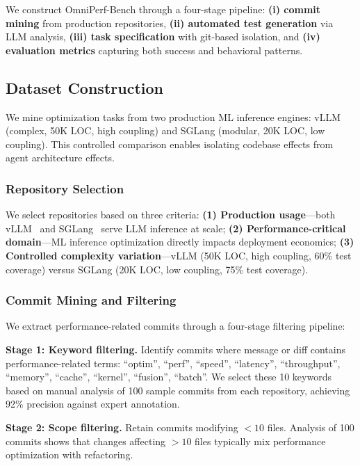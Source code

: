\documentclass{article}
\theoremstyle{plain}
\theoremstyle{definition}
\theoremstyle{remark}
\begin{document}
We construct OmniPerf-Bench through a four-stage pipeline: \textbf{(i) commit mining} from production repositories, \textbf{(ii) automated test generation} via LLM analysis, \textbf{(iii) task specification} with git-based isolation, and \textbf{(iv) evaluation metrics} capturing both success and behavioral patterns.

\subsection{Dataset Construction}

We mine optimization tasks from two production ML inference engines: vLLM (complex, 50K LOC, high coupling) and SGLang (modular, 20K LOC, low coupling). This controlled comparison enables isolating codebase effects from agent architecture effects.

\subsubsection{Repository Selection}

We select repositories based on three criteria: \textbf{(1) Production usage}---both vLLM~\citep{kwon2023vllm} and SGLang~\citep{zheng2023sglang} serve LLM inference at scale; \textbf{(2) Performance-critical domain}---ML inference optimization directly impacts deployment economics; \textbf{(3) Controlled complexity variation}---vLLM (50K LOC, high coupling, 60\% test coverage) versus SGLang (20K LOC, low coupling, 75\% test coverage).

\subsubsection{Commit Mining and Filtering}

We extract performance-related commits through a four-stage filtering pipeline:

\textbf{Stage 1: Keyword filtering.} Identify commits where message or diff contains performance-related terms: ``optim'', ``perf'', ``speed'', ``latency'', ``throughput'', ``memory'', ``cache'', ``kernel'', ``fusion'', ``batch''. We select these 10 keywords based on manual analysis of 100 sample commits from each repository, achieving 92\% precision against expert annotation.

\textbf{Stage 2: Scope filtering.} Retain commits modifying $<10$ files. Analysis of 100 commits shows that changes affecting $>10$ files typically mix performance optimization with refactoring.
\end{document}
